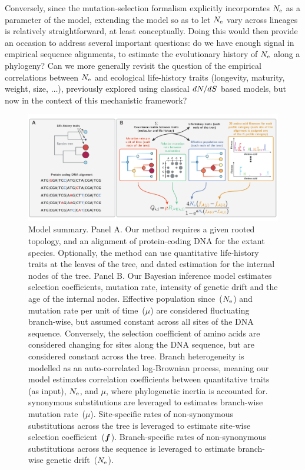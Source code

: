 \documentclass{MBE}
\begin{document}
	Conversely, since the mutation-selection formalism explicitly incorporates $N_{\text{e}}$ as a parameter of the model, extending the model so as to let $N_{\text{e}}$ vary across lineages is relatively straightforward, at least conceptually.
	Doing this would then provide an occasion to address several important questions: do we have enough signal in empirical sequence alignments, to estimate the evolutionary history of $N_{\text{e}}$ along a phylogeny?
	Can we more generally revisit the question of the empirical correlations between $N_{\text{e}}$ and ecological life-history traits (longevity, maturity, weight, size, $\hdots$), previously explored using classical $dN/dS$ based models, but now in the context of this mechanistic framework?

	\begin{figure}[ht]
		\centering
		\includegraphics[width=\textwidth] {model_summary.pdf}
		\caption[Model summary]{
		Model summary.
		Panel A.
		Our method requires a given rooted topology, and an alignment of protein-coding {DNA} for the extant species.
		Optionally, the method can use quantitative life-history traits at the leaves of the tree, and dated estimation for the internal nodes of the tree.
		Panel B.
		Our Bayesian inference model estimates selection coefficients, mutation rate, intensity of {genetic drift} and the age of the internal nodes.
		Effective population since~($N_{\text{e}}$) and mutation rate per unit of time~($\mu$) are considered fluctuating branch-wise, but assumed constant across all sites of the {DNA} sequence.
		Conversely, the selection coefficient of amino acids are considered changing for sites along the {DNA} sequence, but are considered constant across the tree.
		Branch heterogeneity is modelled as an auto-correlated log-Brownian process, meaning our model estimates correlation coefficients between quantitative traits (as input), $N_{\text{e}}$, and $\mu$, where phylogenetic inertia is accounted for.
		{synonymous} substitutions are leveraged to estimates branch-wise mutation rate~($\mu$).
		Site-specific rates of {non-synonymous} substitutions across the tree is leveraged to estimate site-wise selection coefficient~($\bm{f}$).
		Branch-specific rates of {non-synonymous} substitutions across the sequence is leveraged to estimate branch-wise genetic drift~($N_{\text{e}}$).
		}
		\label{fig:modelSummary}
	\end{figure}
\end{document}
